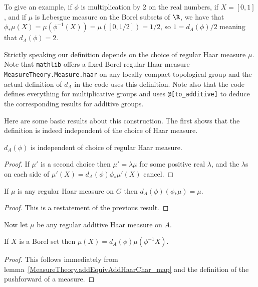 To give an example, if $\phi$ is multiplication by $2$ on the real numbers,
if $X=[0,1]$, and if $\mu$ is Lebesgue measure on the Borel subsets of $\R$,
we have that $\phi_*\mu(X)=\mu(\phi^{-1}(X))=\mu([0,1/2])=1/2$,
so $1=d_A(\phi)/2$ meaning that $d_A(\phi)=2$.

Strictly speaking our definition depends on the choice of regular Haar
measure $\mu$. Note that {\tt mathlib} offers a fixed Borel regular Haar measure
{\tt MeasureTheory.Measure.haar} on any locally compact topological group
and the actual definition of $d_A$ in the code uses this definition.
Note also that the code defines everything for multiplicative groups
and uses {\tt @[to\_additive]} to deduce the corresponding results
for additive groups.

Here are some basic results about this construction. The first shows that
the definition is indeed independent of the choice of Haar measure.

\begin{lemma}
  \label{MeasureTheory.addEquivAddHaarChar_eq}
  \leanok
  $d_A(\phi)$ is independent of choice of regular Haar measure.
\end{lemma}
\begin{proof}
  \leanok
  If $\mu'$ is a second choice then $\mu'=\lambda\mu$ for some
  positive real $\lambda$, and the $\lambda$s on each side of
  $\mu'(X)=d_A(\phi)\phi_*\mu'(X)$ cancel.
\end{proof}

\begin{lemma}
  \label{MeasureTheory.addEquivAddHaarChar_map}
  \leanok
  If $\mu$ is any regular Haar measure on $G$ then
  $d_A(\phi)(\phi_*\mu) = \mu.$
\end{lemma}
\begin{proof}
  This is a restatement of the previous result.
\end{proof}

Now let $\mu$ be any regular additive Haar measure on $A$.

\begin{lemma}
  \label{MeasureTheory.addEquivAddHaarChar_smul_preimage}
  \leanok
  If $X$ is a Borel set then $\mu(X)=d_A(\phi)\mu(\phi^{-1}X)$.
\end{lemma}
\begin{proof}
  This follows immediately from lemma~\ref{MeasureTheory.addEquivAddHaarChar_map}
  and the definition of the pushforward of a measure.
\end{proof}

